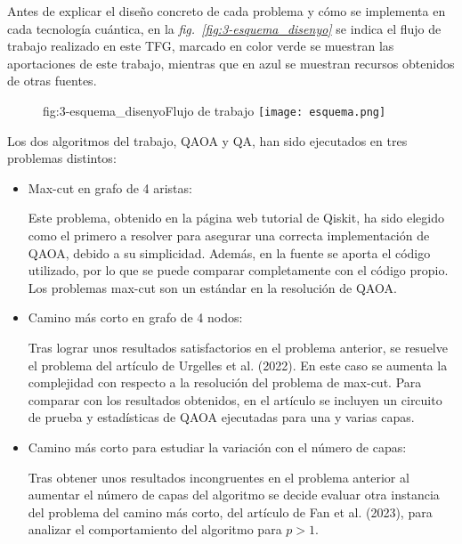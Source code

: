 Antes de explicar el diseño concreto de cada problema y cómo se implementa en cada tecnología cuántica, en la \textit{fig.~\ref{fig:3-esquema_disenyo}} se indica el flujo de trabajo realizado en este TFG, marcado en color verde se muestran las aportaciones de este trabajo, mientras que en azul se muestran recursos obtenidos de otras fuentes.

\begin{figure}[Flujo de trabajo]{fig:3-esquema_disenyo}{Flujo de trabajo}
  \centering
  \texttt{[image: esquema.png]}
\end{figure}

Los dos algoritmos del trabajo, QAOA y QA, han sido ejecutados en tres problemas distintos:

\begin{itemize}
\item Max-cut en grafo de 4 aristas:

  Este problema, obtenido en la página web tutorial de Qiskit\cite{qiskit_tutorial_antiguo}, ha sido elegido como el primero a resolver para asegurar una correcta implementación de QAOA, debido a su simplicidad.
  Además, en la fuente se aporta el código utilizado, por lo que se puede comparar completamente con el código propio.
  Los problemas max-cut son un estándar en la resolución de QAOA.

\item Camino más corto en grafo de 4 nodos:

  Tras lograr unos resultados satisfactorios en el problema anterior, se resuelve el problema del artículo de Urgelles et al. (2022)\cite{multi-objective_routing_optimization}.
  En este caso se aumenta la complejidad con respecto a la resolución del problema de max-cut.
  Para comparar con los resultados obtenidos, en el artículo se incluyen un circuito de prueba y estadísticas de QAOA ejecutadas para una y varias capas.

\item Camino más corto para estudiar la variación con el número de capas:

  Tras obtener unos resultados incongruentes en el problema anterior al aumentar el número de capas del algoritmo se decide evaluar otra instancia del problema del camino más corto, del artículo de Fan et al. (2023)\cite{solving_shortest_path_with_qaoa}, para analizar el comportamiento del algoritmo para $p > 1$.
\end{itemize}

